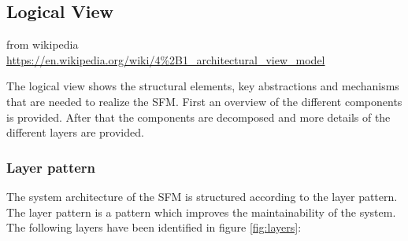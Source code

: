 \subsection{Logical View}

{from wikipedia\\\url{https://en.wikipedia.org/wiki/4\%2B1_architectural_view_model}}

The logical view shows the structural elements, key abstractions and mechanisms that are needed to realize the SFM. First an overview of the different components is provided. After that the components are decomposed and more details of the different layers are provided.




%	

\subsubsection*{Layer pattern}
The system architecture of the SFM is structured according to the layer pattern. The layer pattern is a pattern which improves the maintainability of the system. The following layers have been identified in figure \ref{fig:layers}:


